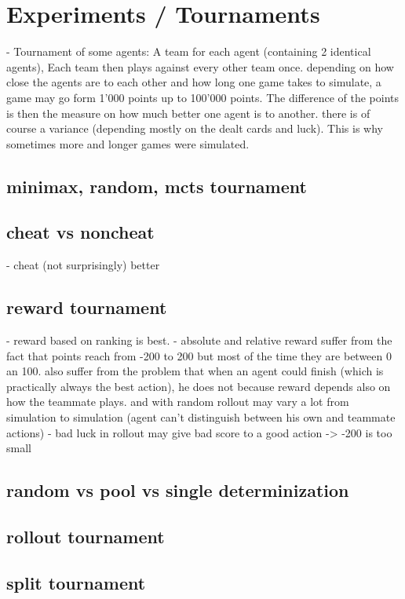 \chapter{Experiments / Tournaments}
\label{ch:experiments}
- Tournament of some agents: A team for each agent (containing 2 identical agents), Each team then plays against every other team once.
depending on how close the agents are to each other and how long one game takes to simulate, a game may go form 1'000 points up to 100'000 points.
The difference of the points is then the measure on how much better one agent is to another.
there is of course a variance (depending mostly on the dealt cards and luck). This is why sometimes more and longer games were simulated.

\section{minimax, random, mcts tournament}

\section{cheat vs noncheat} %
- cheat (not surprisingly) better
\section{reward tournament}
- reward based on ranking is best.
- absolute and relative reward suffer from the fact that points reach from -200 to 200 but most of the time they are between 0 an 100. also suffer from the problem that when an agent could finish (which is practically always the best action), he does not because reward depends also on how the teammate plays. and with random rollout may vary a lot from simulation to simulation (agent can't distinguish between his own and teammate actions)
- bad luck in rollout may give bad score to a good action -> -200 is too small

\section{random vs pool vs single determinization}
\section{rollout tournament}
\section{split tournament} %

